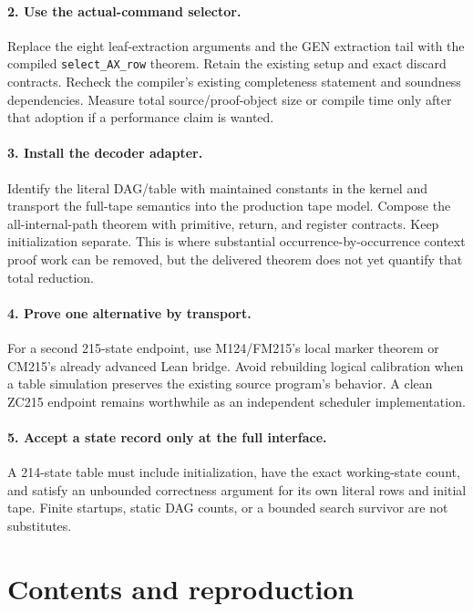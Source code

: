 \documentclass[11pt]{article}
\newcommand{\code}[1]{\texttt{#1}}
\theoremstyle{remark}
\begin{document}
\paragraph{2. Use the actual-command selector.}
Replace the eight leaf-extraction arguments and the GEN extraction tail
with the compiled \code{select\_AX\_row} theorem. Retain the existing setup
and exact discard contracts. Recheck the compiler's existing completeness
statement and soundness dependencies. Measure total source/proof-object
size or compile time only after that adoption if a performance claim is
wanted.

\paragraph{3. Install the decoder adapter.}
Identify the literal DAG/table with maintained constants in the kernel
and transport the full-tape semantics into the production tape model.
Compose the all-internal-path theorem with primitive, return, and register
contracts. Keep initialization separate. This is where substantial
occurrence-by-occurrence context proof work can be removed, but the
delivered theorem does not yet quantify that total reduction.

\paragraph{4. Prove one alternative by transport.}
For a second 215-state endpoint, use M124/FM215's local marker theorem
or CM215's already advanced Lean bridge. Avoid rebuilding logical
calibration when a table simulation preserves the existing source
program's behavior. A clean ZC215 endpoint remains worthwhile as an
independent scheduler implementation.

\paragraph{5. Accept a state record only at the full interface.}
A 214-state table must include initialization, have the exact working-state
count, and satisfy an unbounded correctness argument for its own literal
rows and initial tape. Finite startups, static DAG counts, or a bounded
search survivor are not substitutes.

\section{Contents and reproduction}
\end{document}
